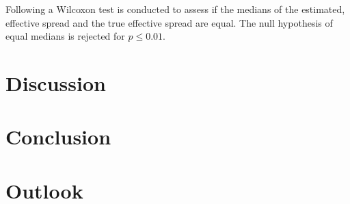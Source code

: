 Following \textcite[][12]{theissenTestAccuracyLee2000} a Wilcoxon test is conducted to assess if the medians of the estimated, effective spread and the true effective spread are equal. The null hypothesis of equal medians is rejected for $p \leq 0.01$.



\newpage
\section{Discussion}\label{sec:discussion}

\newpage
\section{Conclusion}\label{sec:conclusion}

\newpage
\section{Outlook}\label{sec:outlook}

